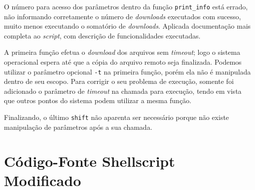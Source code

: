 \documentclass{article}
\begin{document}
O número para acesso dos parâmetros dentro da função \texttt{print\_info} está
errado, não informando corretamente o número de \textit{downloads} executados
com sucesso, muito menos executando o somatório de \textit{downloads}. Aplicada
documentação mais completa ao \textit{script}, com descrição de funcionalidades
executadas.

A primeira função efetua o \textit{download} dos arquivos sem \textit{timeout};
logo o sistema operacional espera até que a cópia do arquivo remoto seja
finalizada. Podemos utilizar o parâmetro opcional \texttt{-t} na primeira
função, porém ela não é manipulada dentro de seu escopo. Para corrigir o seu
problema de execução, somente foi adicionado o parâmetro de \textit{timeout} na
chamada para execução, tendo em vista que outros pontos do sistema podem
utilizar a mesma função.

Finalizando, o último \texttt{shift} não aparenta ser necessário porque não
existe manipulação de parâmetros após a sua chamada.

\section{Código-Fonte Shellscript Modificado}
\end{document}
